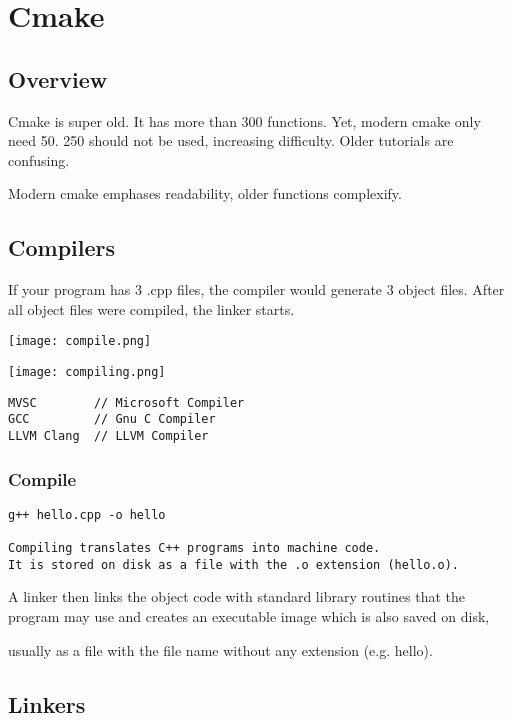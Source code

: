\chapter{Cmake}

\section{Overview}

Cmake is super old. It has more than 300 functions.
Yet, modern cmake only need 50. 250 should not be used, increasing difficulty.
Older tutorials are confusing.

Modern cmake emphases readability, older functions complexify.

\section{Compilers}

If your program has 3 .cpp files, the compiler would generate 3 object files. 
After all object files were compiled, the linker starts. 

\begin{center}
\texttt{[image: compile.png]}
\end{center}

\begin{center}
\texttt{[image: compiling.png]}
\end{center}

\begin{verbatim}
MVSC        // Microsoft Compiler
GCC         // Gnu C Compiler
LLVM Clang  // LLVM Compiler
\end{verbatim}

\subsection{Compile}
\begin{verbatim}
g++ hello.cpp -o hello

Compiling translates C++ programs into machine code.
It is stored on disk as a file with the .o extension (hello.o). 
\end{verbatim}

A linker then links the object code with standard library routines
that the program may use and creates an executable image which is also saved on disk,

usually as a file with the file name without any extension (e.g. hello).

\section{Linkers}

